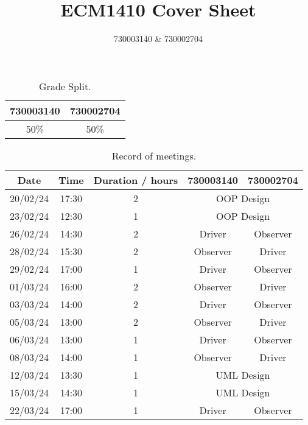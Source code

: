 \documentclass{article}
\title{ECM1410 Cover Sheet}
\author{730003140 \& 730002704}
\begin{document}
\maketitle

\begin{table}[h]
    \centering
    \begin{tabular}{cc}
        \toprule
        \textbf{730003140} & \textbf{730002704} \\
        \midrule
        50\%               & 50\%               \\
        \bottomrule
    \end{tabular}
    \caption{Grade Split.}
\end{table}

\begin{table}[h]
    \centering
    \begin{tabular}{ccccc}
        \toprule
        \textbf{Date} & \textbf{Time} & \textbf{Duration / hours} & \textbf{730003140}             & \textbf{730002704} \\
        \midrule
        20/02/24      & 17:30         & 2                         & \multicolumn{2}{c}{OOP Design}                      \\
        23/02/24      & 12:30         & 1                         & \multicolumn{2}{c}{OOP Design}                      \\
        26/02/24      & 14:30         & 2                         & Driver                         & Observer           \\
        28/02/24      & 15:30         & 2                         & Observer                       & Driver             \\
        29/02/24      & 17:00         & 1                         & Driver                         & Observer           \\
        01/03/24      & 16:00         & 2                         & Observer                       & Driver             \\
        03/03/24      & 14:00         & 2                         & Driver                         & Observer           \\
        05/03/24      & 13:00         & 2                         & Observer                       & Driver             \\
        06/03/24      & 13:00         & 1                         & Driver                         & Observer           \\
        08/03/24      & 14:00         & 1                         & Observer                       & Driver             \\
        12/03/24      & 13:30         & 1                         & \multicolumn{2}{c}{UML Design}                      \\
        15/03/24      & 14:30         & 1                         & \multicolumn{2}{c}{UML Design}                      \\
        22/03/24      & 17:00         & 1                         & Driver                         & Observer           \\
        \bottomrule
    \end{tabular}
    \caption{Record of meetings.}
\end{table}
\end{document}
